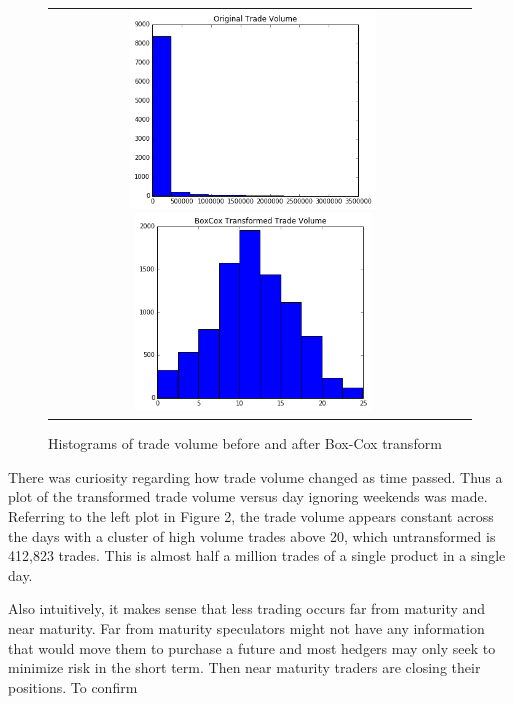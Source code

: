 \documentclass[12pt]{article}
\begin{document}
\begin{figure}[H]
	\begin{center}
	\begin{tabular}{cc}
		\includegraphics[width=6.5cm]{hist_orig.png}
		\includegraphics[width=6.25cm]{hist_bc.png}
	\end{tabular}
	\caption{Histograms of  trade volume before and after Box-Cox transform}
	\label{fig:dum1}
	\end{center}
\end{figure}

There was curiosity regarding how trade volume changed as time passed. Thus a plot of the transformed trade volume versus day ignoring weekends was made. Referring to the left plot in Figure 2, the trade volume appears constant across the days with a cluster of high volume trades above 20, which untransformed is 412,823 trades. This is almost half a million trades of a single product in a single day.

Also intuitively, it makes sense that less trading occurs far from maturity and near maturity. Far from maturity speculators might not have any information that would move them to purchase a future and most hedgers may only seek to minimize risk in the short term. Then near maturity traders are closing their positions. To confirm 
\end{document}
